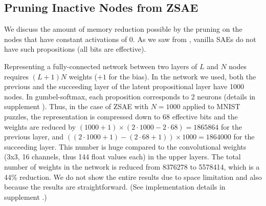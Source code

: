 \subsection{Pruning Inactive Nodes from ZSAE}


We discuss the amount of memory reduction possible by the pruning on the nodes
that have constant activations of 0. As we saw from ,
vanilla SAEs do not have such propositions (all bits are effective).

Representing a fully-connected
network between two layers of $L$ and $N$ nodes requires $(L+1)N$
weights ($+1$ for the bias).
In the network we used,
both the previous and the succeeding layer of the latent propositional layer have 1000 nodes.
In gumbel-softmax, each proposition corresponds to 2 neurons (details in supplement ).
Thus, in the case of ZSAE with $N=1000$ applied to MNIST puzzles,
the representation is compressed down to 68 effective bits and
the weights are reduced by $(1000+1)\times (2\cdot 1000 - 2\cdot 68)=1865864$ for the previous layer,
and $((2\cdot 1000+1)-(2\cdot 68+1))\times 1000 =1864000$ for the succeeding layer.
This number is huge compared to the convolutional weights (3x3, 16 channels, thus 144 float values each) in the upper layers.
The total number of weights in the network is reduced from 8376278 to 5578414, which is a 44\% reduction.
We do not show the entire results due to space limitation and also because the results are straightforward.
(See implementation details in supplement .)


